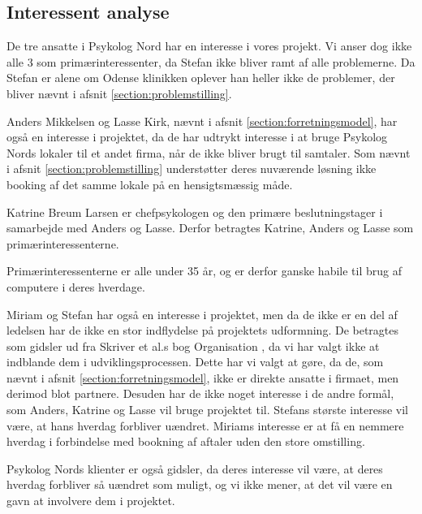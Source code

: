 \subsection{Interessent analyse}

De tre ansatte i Psykolog Nord har en interesse i vores projekt. Vi anser dog ikke alle 3 som primærinteressenter, da Stefan ikke bliver ramt af alle problemerne.
Da Stefan er alene om Odense klinikken oplever han heller ikke de problemer, der bliver nævnt i afsnit \ref{section:problemstilling}.

Anders Mikkelsen og Lasse Kirk, nævnt i afsnit \ref{section:forretningsmodel}, har også en interesse i projektet, da de har udtrykt interesse i at bruge Psykolog Nords lokaler til et andet firma, når de ikke bliver brugt til samtaler.
Som nævnt i afsnit \ref{section:problemstilling} understøtter deres nuværende løsning ikke booking af det samme lokale på en hensigtsmæssig måde.

Katrine Breum Larsen er chefpsykologen og den primære beslutningstager i samarbejde med Anders og Lasse.
Derfor betragtes Katrine, Anders og Lasse som primærinteressenterne.

Primærinteressenterne er alle under 35 år, og er derfor ganske habile til brug af computere i deres hverdage.

Miriam og Stefan har også en interesse i projektet, men da de ikke er en del af ledelsen har de ikke en stor indflydelse på projektets udformning.
De betragtes som gidsler ud fra Skriver et al.s bog Organisation \cite[s. 435]{interessentanalyse}, da vi har valgt ikke at indblande dem i udviklingsprocessen.
Dette har vi valgt at gøre, da de, som nævnt i afsnit \ref{section:forretningsmodel}, ikke er direkte ansatte i firmaet, men derimod blot partnere.
Desuden har de ikke noget interesse i de andre formål, som Anders, Katrine og Lasse vil bruge projektet til. 
Stefans største interesse vil være, at hans hverdag forbliver uændret.
Miriams interesse er at få en nemmere hverdag i forbindelse med bookning af aftaler uden den store omstilling.

Psykolog Nords klienter er også gidsler, da deres interesse vil være, at deres hverdag forbliver så uændret som muligt, og vi ikke mener, at det vil være en gavn at involvere dem i projektet.